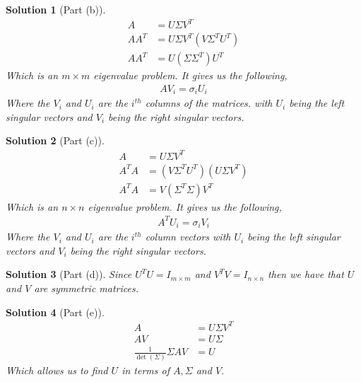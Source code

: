 \documentclass[leqno]{article}
\theoremstyle{nonumberplain}
\newtheorem{solution}{Solution}
\begin{document}
\begin{solution}[Part (b)]
\begin{align*}
A&=U\Sigma V^T\\
AA^T&= U\Sigma V^T (V \Sigma^T U^T)\\
AA^T&=U(\Sigma \Sigma^T)U^T
\end{align*}
Which is an $m\times m$ eigenvalue problem. It gives us the following,
\begin{align*}
AV_i=\sigma_i U_i
\end{align*}
Where the $V_i$ and $U_i$ are the $i^{th}$ columns of the matrices. with $U_i$ being the left singular vectors and $V_i$ being the right singular vectors.
\end{solution}

\begin{solution}[Part (c)]
\begin{align*}
A&=U\Sigma V^T\\
A^TA&= (V\Sigma^T U^T) (U \Sigma V^T)\\
A^TA&=V(\Sigma^T \Sigma)V^T
\end{align*}
Which is an $n\times n$ eigenvalue problem. It gives us the following,
\begin{align*}
A^T U_i=\sigma_i V_i
\end{align*}
Where the $V_i$ and $U_i$ are the $i^{th}$ column vectors with $U_i$ being the left singular vectors and $V_i$ being the right singular vectors.
\end{solution}

\begin{solution}[Part (d)]
Since $U^T U = I_{m \times m}$ and $V^T V = I_{n \times n}$ then we have that $U$ and $V$ are symmetric matrices.
\end{solution}

\begin{solution}[Part (e)]
\begin{align*}
A&=U\Sigma V^T\\
AV &= U \Sigma\\
\frac{1}{\det(\Sigma)}\Sigma AV&=U
\end{align*}
Which allows us to find $U$ in terms of $A, \Sigma$ and $V$.
\end{solution}

\pagebreak

\end{document}
